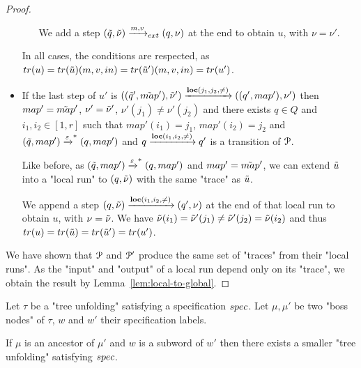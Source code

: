 \begin{proof}
\begin{itemize}
\begin{itemize}
			We add a step $(\Tilde{q}, \Tilde{\nu}) \xrightarrow{m,v}_{ext} (q, \nu)$ at the end to obtain $u$, with $\nu = \nu'$.
		\end{itemize}
	
		In all cases, the conditions are respected, as $\trace{u} = \trace{\Tilde{u}} (m,v, in) = \trace{\Tilde{u}'} (m,v, in) = \trace{u'}$.
		
		\item If the last step of $u'$ is $((\Tilde{q}', \Tilde{map}'), \Tilde{\nu}') \xrightarrow{\textbf{loc}(j_1,j_2,{\ne})} ((q', map'), \nu')$ then $map'=\Tilde{map}'$, $\nu' = \Tilde{\nu}'$, $\nu'(j_1) \neq \nu'(j_2)$ and there exists $q \in Q$ and $i_1, i_2 \in [1,r]$ such that $map'(i_1)=j_1$, $map'(i_2)=j_2$ and $(\Tilde{q}, map') \xrightarrow{\varepsilon}^* (q, map')$ and $q \xrightarrow{\textbf{loc}(i_1,i_2,{\ne})} q'$ is a transition of $\mathcal{P}$.
		
		Like before, as $(\Tilde{q}, map') \xrightarrow{\varepsilon}^* (q, map')$ and $map'=\Tilde{map}'$, we can extend $\Tilde{u}$ into a "local run" to $(q, \Tilde{\nu})$ with the same "trace" as $\Tilde{u}$.
		
		
		We append a step $(q, \Tilde{\nu}) \xrightarrow{\textbf{loc}(i_1,i_2,{\ne})} (q', \nu)$ at the end of that local run to obtain $u$, with $\nu = \Tilde{\nu}$. We have $\Tilde{\nu}(i_1) = \Tilde{\nu}'(j_1) \neq \Tilde{\nu}'(j_2) = \Tilde{\nu}(i_2)$ and thus $\trace{u} = \trace{\Tilde{u}} = \trace{\Tilde{u}'} = \trace{u'}$.
	\end{itemize}

We have shown that $\mathcal{P}$ and $\mathcal{P}'$ produce the same set of "traces" from their "local runs". As the "input" and "output" of a local run depend only on its "trace", we obtain the result by Lemma~\ref{lem:local-to-global}.
\end{proof}
\fi

\begin{lemma}
	Let $\tau$ be a "tree unfolding" satisfying a specification $spec$.
	Let $\mu, \mu'$ be two "boss nodes" of $\tau$, $w$ and $w'$ their specification labels.
	
	If $\mu$ is an ancestor of $\mu'$ and $w$ is a subword of $w'$ then there exists a smaller "tree unfolding" satisfying $spec$.  
\end{lemma}


